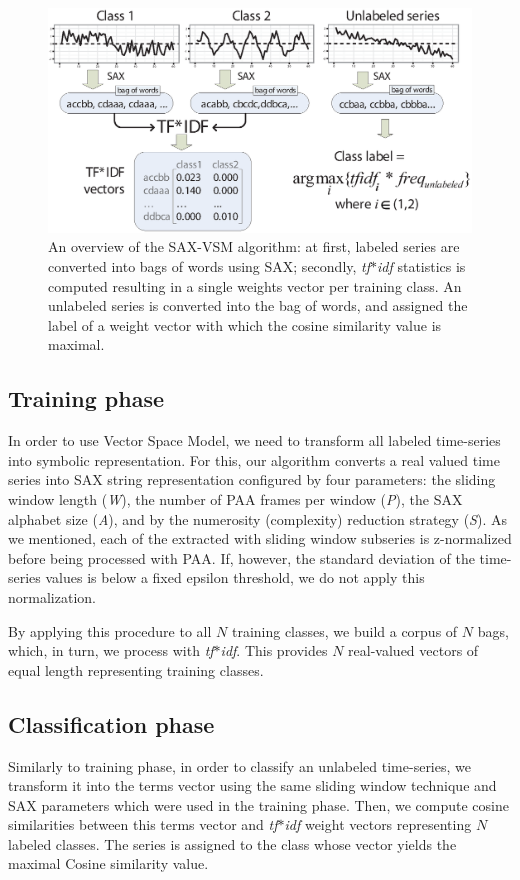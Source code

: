 \documentclass{llncs}
\newcommand{\myfigureshrinker}{\vspace{-1cm}}
\begin{document}
\begin{figure}[t]
   \centering
   \myfigureshrinker
   \includegraphics[width=115mm]{figures/overview.eps}
   \caption{
   An overview of the SAX-VSM algorithm: 
   at first, labeled series are converted into bags of words using SAX; 
   secondly, \textit{tf$\ast$idf} statistics is computed resulting in 
   a single weights vector per training class. An unlabeled series is converted 
   into the bag of words, and assigned the label of a weight vector with which 
   the cosine similarity value is maximal.}
   \label{fig:overview}
\end{figure}

\subsection{Training phase}
In order to use Vector Space Model, we need to transform all labeled time-series into 
symbolic representation.  For this, our algorithm converts a real valued time series 
into SAX string representation configured by four parameters: the sliding window
length (\textit{W}), the number of PAA frames per window (\textit{P}), the SAX alphabet size
(\textit{A}), and by the numerosity (complexity) reduction strategy (\textit{S}). 
As we mentioned, each of the extracted with sliding window subseries is z-normalized
before being processed with PAA.
If, however, 
the standard deviation of the time-series values is below a fixed epsilon threshold, 
we do not apply this normalization.

By applying this procedure to all $N$ training classes, we build a corpus of $N$ bags, 
which, in turn, we process with \textit{tf$\ast$idf}. This provides $N$ real-valued 
vectors of equal length representing training classes. 

\subsection{Classification phase}
Similarly to training phase, in order to classify an unlabeled time-series, we transform it into the
terms vector using the same sliding window technique and SAX parameters which were used 
in the training phase. Then, we compute cosine similarities between this terms vector and 
\textit{tf$\ast$idf} weight vectors representing $N$ labeled classes. 
The series is assigned to the class whose vector yields the maximal Cosine similarity value.
\end{document}
